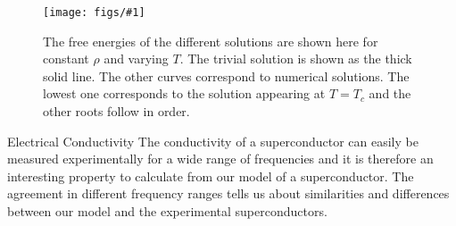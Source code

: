 \documentclass[12pt]{report}
\newcommand{\fig}[3]{
\begin{figure}
\centering
\texttt{[image: figs/\#1]}
\caption{#2}
\end{figure}
}
\begin{document}
\fig{A_constRho_a2_0.0.pdf}{The free energies of the different solutions are shown here for constant $\rho$ and varying $T$. The trivial solution is shown as the thick solid line. The other curves correspond to numerical solutions. The lowest one corresponds to the solution appearing at $T=T_c$ and the other roots follow in order.\label{f:A}}

\section{Electrical Conductivity}
The conductivity of a superconductor can easily be measured experimentally for a wide range of frequencies and it is therefore an interesting property to calculate from our model of a superconductor. The agreement in different frequency ranges tells us about similarities and differences between our model and the experimental superconductors.\\
\end{document}
